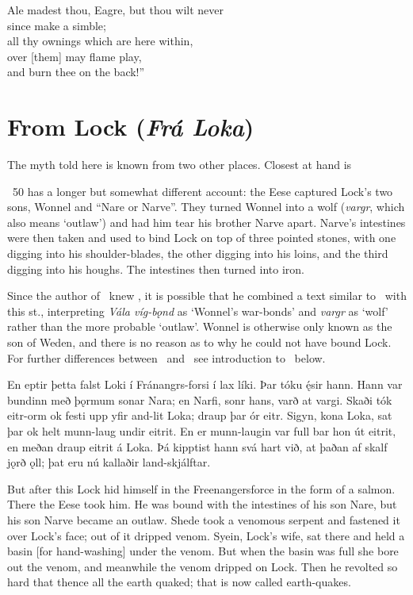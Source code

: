 \bvb Ale madest thou, Eagre, but thou wilt never \\
since make a simble; \\
all thy ownings which are here within, \\
over [them] may flame play, \\
and burn thee on the back!”\evb
\evg

\sectionline

\section{From Lock (\emph{Frá Loka})}

The myth told here is known from two other places. Closest at hand is \Voluspa\

\Gylfaginning\ 50 has a longer but somewhat different account: the Eese captured Lock’s two sons, Wonnel and “Nare or Narve”. They turned Wonnel into a wolf (\emph{vargr}, which also means ‘outlaw’) and had him tear his brother Narve apart. Narve’s intestines were then taken and used to bind Lock on top of three pointed stones, with one digging into his shoulder-blades, the other digging into his loins, and the third digging into his houghs. The intestines then turned into iron.

Since the author of \Gylfaginning\ knew \Voluspa, it is possible that he combined a text similar to \FraLoka\ with this st., interpreting \emph{Vála víg-bǫnd} as ‘Wonnel’s war-bonds’ and \emph{vargr} as ‘wolf’ rather than the more probable ‘outlaw’. Wonnel is otherwise only known as the son of Weden, and there is no reason as to why he could not have bound Lock. For further differences between \Gylfaginning\ and \FraLoka\ see introduction to \FraLoka\ below.

\sectionline

\bpg\bpa En eptir þetta falst Loki í Fránangrs-forsi í lax líki. Þar tóku ę́sir hann. Hann var bundinn með þǫrmum sonar Nara; en Narfi, sonr hans, varð at vargi. Skaði tók eitr-orm ok festi upp yfir and-lit Loka; draup þar ór eitr. Sigyn, kona Loka, sat þar ok helt munn-laug undir eitrit. En er munn-laugin var full bar hon út eitrit, en meðan draup eitrit á Loka. Þá kipptist hann svá hart við, at þaðan af skalf jǫrð ǫll; þat eru nú kallaðir land-skjálftar.\epa

\bpb But after this Lock hid himself in the Freenangersforce in the form of a salmon. There the Eese took him. He was bound with the intestines of his son Nare, but his son Narve became an outlaw. Shede took a venomous serpent and fastened it over Lock’s face; out of it dripped venom. Syein, Lock’s wife, sat there and held a basin [for hand-washing] under the venom. But when the basin was full she bore out the venom, and meanwhile the venom dripped on Lock. Then he revolted so hard that thence all the earth quaked; that is now called earth-quakes.\epb\epg
